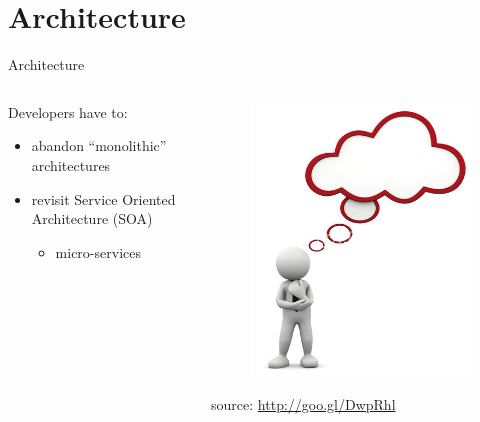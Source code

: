 %
%
\section{Architecture}
\begin{frame}{Architecture}
	\begin{columns}
		\begin{column}{0.6\textwidth}
			Developers have to:
			\begin{itemize}
				\item{\footnotesize{abandon ``monolithic'' architectures}}
				\item{\footnotesize{revisit Service Oriented Architecture (SOA)}}
				\begin{itemize}
					\item{\scriptsize{micro-services}}
				\end{itemize}
			\end{itemize}
		\end{column}
		\begin{column}{0.4\textwidth}
			\begin{figure}
				\centering{}
				\includegraphics[scale=0.2]{images/think.png}
			\end{figure}
			\begin{flushright}
				\tiny{source: \url{http://goo.gl/DwpRhl}}
			\end{flushright}
		\end{column}
	\end{columns}
\end{frame}

